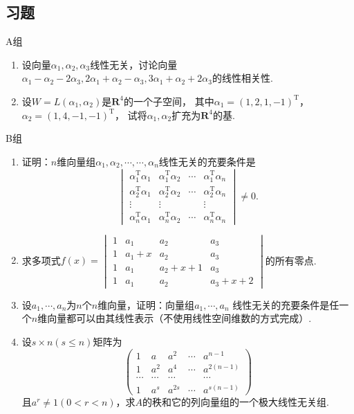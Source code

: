 \subsection{习题}
\centerline{\heiti A组}
\begin{enumerate}
	\item 设向量$\alpha_1,\alpha_2,\alpha_3$线性无关，讨论向量$\alpha_1-\alpha_2-2\alpha_3,
	2\alpha_1+\alpha_2-\alpha_3,3\alpha_1+\alpha_2+2\alpha_3$的线性相关性.
	\item 设$W=L(\alpha_1,\alpha_2)$是$\mathbf{R}^4$的一个子空间，
	其中$\alpha_1=(1,2,1,-1)^\mathrm{T}$，$\alpha_2=(1,4,-1,-1)^\mathrm{T}$，
	试将$\alpha_1,\alpha_2$扩充为$\mathbf{R}^4$的基.
\end{enumerate}
\centerline{\heiti B组}
\begin{enumerate}
	\item 证明：$n$维向量组$\alpha_1,\alpha_2,\cdots,\cdots,\alpha_n$线性无关的充要条件是$$\begin{vmatrix}
		\alpha_1^\mathrm{T}\alpha_1 & \alpha_1^\mathrm{T}\alpha_2 & \cdots & \alpha_1^\mathrm{T}\alpha_n \\
		\alpha_2^\mathrm{T}\alpha_1 & \alpha_2^\mathrm{T}\alpha_2 & \cdots & \alpha_2^\mathrm{T}\alpha_n \\
		\vdots & \vdots &  & \vdots \\
		\alpha_n^\mathrm{T}\alpha_1 & \alpha_n^\mathrm{T}\alpha_2 & \cdots & \alpha_n^\mathrm{T}\alpha_n
	\end{vmatrix}\neq 0.$$
	\item 求多项式$f(x)=\begin{vmatrix}
		1 & a_1 & a_2 & a_3 \\
		1 & a_1+x & a_2 & a_3 \\
		1 & a_1 & a_2+x+1 & a_3 \\
		1 & a_1 & a_2 & a_3+x+2
	\end{vmatrix}$的所有零点.
	\item 设$a_1,\cdots,a_n$为$n$个$n$维向量，证明：向量组$a_1,\cdots,a_n$
	线性无关的充要条件是任一个$n$维向量都可以由其线性表示（不使用线性空间维数的方式完成）.
	\item 设$s \times n(s\le n)$矩阵为
	$$\begin{pmatrix}
		1 & a & a^2 & \cdots & a^{n-1} \\
		1 & a^2 & a^4 & \cdots & a^{2(n-1)} \\
		\cdots & \cdots & \cdots &  & \cdots \\
		1 & a^s & a^{2s} & \cdots & a^{s(n-1)}
	\end{pmatrix}$$
	且$a^r\neq 1(0<r<n)$，求$A$的秩和它的列向量组的一个极大线性无关组.
\end{enumerate}